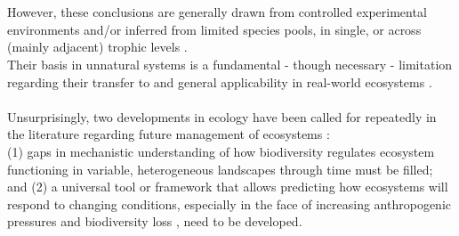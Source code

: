 \\\\ 
However, these conclusions are generally drawn from controlled experimental environments and/or inferred from limited species pools, in single, or across (mainly adjacent) trophic levels \citep[e.g.][]{Finke2005, Byrnes2006}.  \\
Their basis in unnatural systems is a fundamental - though necessary - limitation regarding their transfer to and general applicability in real-world ecosystems \citep{Hillebrand2009}. 
 \\\\ 
 Unsurprisingly, two developments in ecology have been called for repeatedly in the literature regarding future management of ecosystems \citep[e.g.][]{Hooper2012,Naeem2012,Tilman2014}: \\
 (1) gaps in mechanistic understanding of how biodiversity regulates ecosystem functioning in variable, heterogeneous landscapes through time must be filled; and (2) a universal tool or framework that allows predicting how ecosystems will respond to changing conditions, especially in the face of increasing anthropogenic pressures and biodiversity loss \citep{Wardle2011}, need to be developed.\\\\
